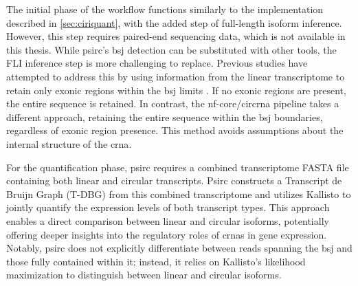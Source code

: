 The initial phase of the workflow functions similarly to the implementation
described in \cref{sec:ciriquant}, with the added step of full-length isoform
inference.
However, this step requires paired-end sequencing data, which is not available
in this thesis.
While psirc's \gls{bsj} detection can be substituted with other tools, the FLI
inference step is more challenging to replace.
Previous studies have attempted to address this by using information from the
linear transcriptome to retain only exonic regions within the \gls{bsj} limits
\supercite{hoffmann_circrna-sponging_2023}.
If no exonic regions are present, the entire sequence is retained.
In contrast, the nf-core/circrna pipeline takes a different approach, retaining
the entire sequence within the \gls{bsj} boundaries, regardless of exonic
region presence.
This method avoids assumptions about the internal structure of the \gls{crna}.

For the quantification phase, psirc requires a combined transcriptome FASTA
file containing both linear and circular transcripts.
Psirc constructs a Transcript de Bruijn Graph (T-DBG) from this combined
transcriptome and utilizes Kallisto to jointly quantify the expression levels
of both transcript types\supercite{yu_quantifying_2021}.
This approach enables a direct comparison between linear and circular isoforms,
potentially offering deeper insights into the regulatory roles of \glspl{crna}
in gene expression.
Notably, psirc does not explicitly differentiate between reads spanning the
\gls{bsj} and those fully contained within it; instead, it relies on Kallisto's
likelihood maximization to distinguish between linear and circular
isoforms\supercite{yu_quantifying_2021}.
